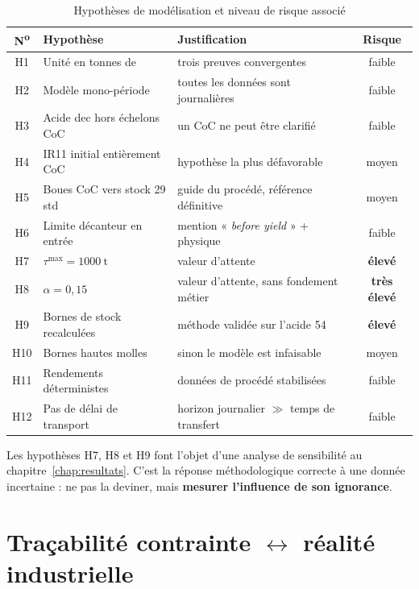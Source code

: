 \begin{table}[H]
\centering
\caption{Hypothèses de modélisation et niveau de risque associé}
\label{tab:hypotheses}
\begin{tabular}{@{}clp{5.8cm}c@{}}
\toprule
\textbf{N\textsuperscript{o}} & \textbf{Hypothèse} & \textbf{Justification} & \textbf{Risque} \\
\midrule
H1 & Unité en tonnes de \PdeuxOcinq{} & trois preuves convergentes & faible \\
H2 & Modèle mono-période & toutes les données sont journalières & faible \\
H3 & Acide dec hors échelons CoC & un CoC ne peut être clarifié & faible \\
H4 & IR11 initial entièrement CoC & hypothèse la plus défavorable & moyen \\
H5 & Boues CoC vers stock 29 std & guide du procédé, référence définitive & moyen \\
H6 & Limite décanteur en entrée & mention « \emph{before yield} » + physique & faible \\
H7 & $\tau^{\max} = \SI{1000}{\tonne}$ & valeur d'attente & \textbf{élevé} \\
H8 & $\alpha = 0{,}15$ & valeur d'attente, sans fondement métier & \textbf{très élevé} \\
H9 & Bornes de stock recalculées & méthode validée sur l'acide 54 & \textbf{élevé} \\
H10 & Bornes hautes molles & sinon le modèle est infaisable & moyen \\
H11 & Rendements déterministes & données de procédé stabilisées & faible \\
H12 & Pas de délai de transport & horizon journalier $\gg$ temps de transfert & faible \\
\bottomrule
\end{tabular}
\end{table}

\begin{encadre}
Les hypothèses H7, H8 et H9 font l'objet d'une analyse de sensibilité au
chapitre~\ref{chap:resultats}. C'est la réponse méthodologique correcte à une donnée
incertaine : ne pas la deviner, mais \textbf{mesurer l'influence de son ignorance}.
\end{encadre}

\section{Traçabilité contrainte $\leftrightarrow$ réalité industrielle}


